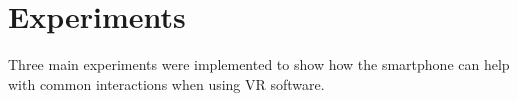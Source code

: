 \chapter{Experiments}\label{chapter:experiments}

Three main experiments were implemented to show how the smartphone can help with common interactions when using \ac{VR} software.